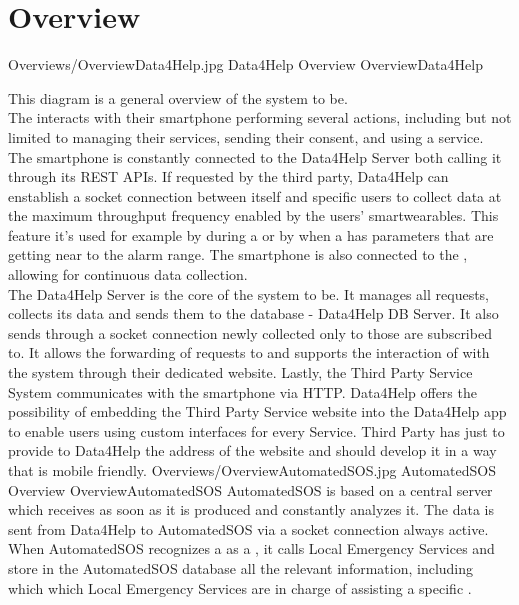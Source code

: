 \documentclass[../../DD.tex]{subfiles}
\begin{document}
\section{Overview \label{sect:2.1}}

	\image {13cm} {Overviews/OverviewData4Help.jpg} {Data4Help Overview} {OverviewData4Help}

	This diagram is a general overview of the system to be.\\
	The  interacts with their smartphone performing several actions, including but not limited to managing their services, sending their consent, and using a service. The smartphone is constantly connected to the Data4Help Server both calling it through its REST APIs. If requested by the third party, Data4Help can enstablish a socket connection between itself and specific users to collect data at the maximum throughput frequency enabled by the users' smartwearables. This feature it's used for example by  during a  or by  when a  has parameters that are getting near to the alarm range. The smartphone is also connected to the , allowing for continuous data collection.\\
	The Data4Help Server is the core of the system to be. It manages all  requests, collects its data and sends them to the database - Data4Help DB Server. It also sends through a socket connection newly collected  only to those  are subscribed to. It allows the forwarding of  requests to  and supports the interaction of  with the system through their dedicated website.
	Lastly, the Third Party Service System communicates with the  smartphone via HTTP. Data4Help offers the possibility of embedding the Third Party Service website into the Data4Help app to enable users using custom interfaces for every Service. Third Party has just to provide to Data4Help the address of the website and should develop it in a way that is mobile friendly.
	\image {13cm} {Overviews/OverviewAutomatedSOS.jpg} {AutomatedSOS Overview} {OverviewAutomatedSOS}
	AutomatedSOS is based on a central server which receives  as soon as it is produced and constantly analyzes it. The data is sent from Data4Help to AutomatedSOS via a socket connection always active. When AutomatedSOS recognizes a  as a , it calls Local Emergency Services and store in the AutomatedSOS database all the relevant information, including which which Local Emergency Services are in charge of assisting a specific .
\end{document}
